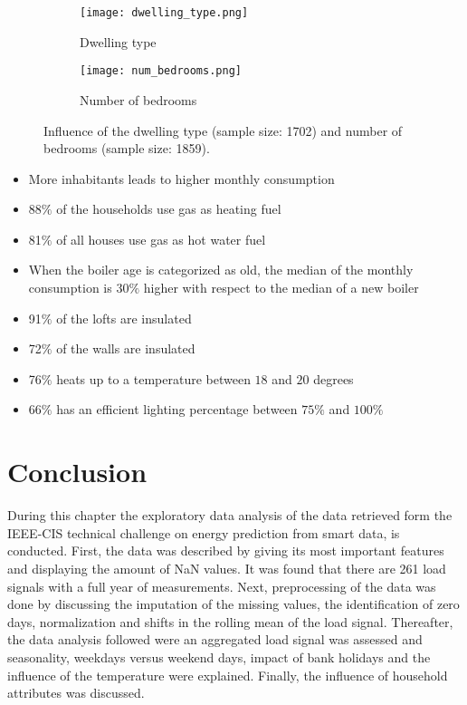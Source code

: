 \begin{figure}[h!]
	\begin{subfigure}{1.0\textwidth}
		\centering
		\texttt{[image: dwelling\_type.png]}
		\caption{Dwelling type}
	\end{subfigure}	 	
	\begin{subfigure}{1.0\textwidth}
		\centering
		\texttt{[image: num\_bedrooms.png]}
		\caption{Number of bedrooms}
	\end{subfigure}	
	\caption{Influence of the dwelling type (sample size: 1702) and number of bedrooms (sample size: 1859). }
	\label{fig:boxplots}
\end{figure}


\begin{itemize}
	\item More inhabitants leads to higher monthly consumption
	\item 88$ \% $  of the households use gas as heating fuel
	\item 81$ \% $  of all houses use gas as hot water fuel
	\item When the boiler age is categorized as old, the median of the monthly consumption is 30$ \% $ higher with respect to the median of a new boiler
	\item 91$\% $ of the lofts are insulated
	\item 72$ \% $ of the walls are insulated
	\item 76$ \% $ heats up to a temperature between $ 18 $ and $ 20  $ degrees
	\item 66$ \% $ has an efficient lighting percentage between $ 75\% $ and $ 100\% $	
\end{itemize}



\section{Conclusion}
During this chapter the exploratory data analysis of the data retrieved form the IEEE-CIS technical challenge on energy prediction from smart data, is conducted. First, the data was described by giving its most important features and displaying the amount of NaN values. It was found that there are 261 load signals with a full year of measurements.  Next, preprocessing of the data was done by discussing the imputation of the missing values, the identification of zero days, normalization and shifts in the rolling mean of the load signal. Thereafter, the data analysis followed were an aggregated load signal was assessed and seasonality, weekdays versus weekend days, impact of bank holidays and the influence of the temperature were explained. Finally, the influence of household attributes was discussed. 



